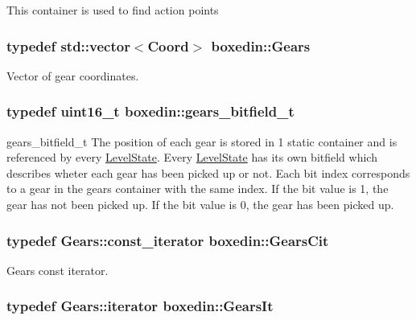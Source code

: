 This container is used to find action points \hypertarget{namespaceboxedin_a9fa1a20bcfcbdd4d7cad2d6fc92725f6}{
\subsubsection[{Gears}]{\setlength{\rightskip}{0pt plus 5cm}typedef std\+::vector$<${\bf Coord}$>$ {\bf boxedin\+::\+Gears}}}\label{namespaceboxedin_a9fa1a20bcfcbdd4d7cad2d6fc92725f6}
Vector of gear coordinates. \hypertarget{namespaceboxedin_a06d85d1dad095f12bcc1a03894abb650}{
\subsubsection[{gears\+\_\+bitfield\+\_\+t}]{\setlength{\rightskip}{0pt plus 5cm}typedef uint16\+\_\+t {\bf boxedin\+::gears\+\_\+bitfield\+\_\+t}}}\label{namespaceboxedin_a06d85d1dad095f12bcc1a03894abb650}
gears\+\_\+bitfield\+\_\+t The position of each gear is stored in 1 static container and is referenced by every \hyperlink{classboxedin_1_1LevelState}{Level\+State}. Every \hyperlink{classboxedin_1_1LevelState}{Level\+State} has its own bitfield which describes wheter each gear has been picked up or not. Each bit index corresponds to a gear in the gears container with the same index. If the bit value is 1, the gear has not been picked up. If the bit value is 0, the gear has been picked up. \hypertarget{namespaceboxedin_ad10e1f3c9ae2e8d08f1bc2ac8c074eb7}{
\subsubsection[{Gears\+Cit}]{\setlength{\rightskip}{0pt plus 5cm}typedef Gears\+::const\+\_\+iterator {\bf boxedin\+::\+Gears\+Cit}}}\label{namespaceboxedin_ad10e1f3c9ae2e8d08f1bc2ac8c074eb7}
Gears const iterator. \hypertarget{namespaceboxedin_a108752fd170b457fe49ff7d9ce6eafc9}{
\subsubsection[{Gears\+It}]{\setlength{\rightskip}{0pt plus 5cm}typedef Gears\+::iterator {\bf boxedin\+::\+Gears\+It}}}\label{namespaceboxedin_a108752fd170b457fe49ff7d9ce6eafc9}
